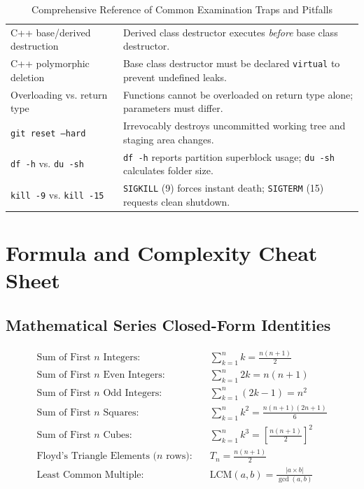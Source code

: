 \begin{table}[htbp]
\begin{tabularx}{\textwidth}{l X}
C++ base/derived destruction & Derived class destructor executes \textit{before} base class destructor. \\
C++ polymorphic deletion & Base class destructor must be declared \texttt{virtual} to prevent undefined leaks. \\
Overloading vs. return type & Functions cannot be overloaded on return type alone; parameters must differ. \\
\texttt{git reset --hard} & Irrevocably destroys uncommitted working tree and staging area changes. \\
\texttt{df -h} vs. \texttt{du -sh} & \texttt{df -h} reports partition superblock usage; \texttt{du -sh} calculates folder size. \\
\texttt{kill -9} vs. \texttt{kill -15} & \texttt{SIGKILL} (9) forces instant death; \texttt{SIGTERM} (15) requests clean shutdown. \\
\bottomrule
\end{tabularx}
\caption{Comprehensive Reference of Common Examination Traps and Pitfalls}
\label{tab:common_exam_traps}
\end{table}

\section{Formula and Complexity Cheat Sheet}
\label{sec:formula_complexity_sheet}

\subsection{Mathematical Series Closed-Form Identities}
\begin{align*}
\text{Sum of First } n \text{ Integers:} &\quad \sum_{k=1}^{n} k = \frac{n(n+1)}{2} \\
\text{Sum of First } n \text{ Even Integers:} &\quad \sum_{k=1}^{n} 2k = n(n+1) \\
\text{Sum of First } n \text{ Odd Integers:} &\quad \sum_{k=1}^{n} (2k - 1) = n^2 \\
\text{Sum of First } n \text{ Squares:} &\quad \sum_{k=1}^{n} k^2 = \frac{n(n+1)(2n+1)}{6} \\
\text{Sum of First } n \text{ Cubes:} &\quad \sum_{k=1}^{n} k^3 = \left[\frac{n(n+1)}{2}\right]^2 \\
\text{Floyd's Triangle Elements (} n \text{ rows):} &\quad T_n = \frac{n(n+1)}{2} \\
\text{Least Common Multiple:} &\quad \text{LCM}(a, b) = \frac{|a \times b|}{\gcd(a, b)}
\end{align*}


